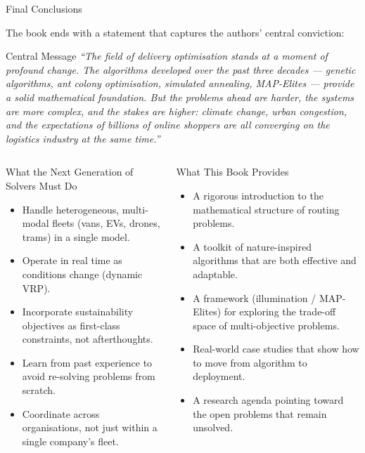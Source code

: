 \documentclass[aspectratio=169,10pt]{beamer}
\begin{document}
\begin{frame}[allowframebreaks]{Final Conclusions}

  The book ends with a statement that captures the authors'
  central conviction:

  \bigskip
  \begin{block}{Central Message}
    \textit{``The field of delivery optimisation stands at a moment
    of profound change.  The algorithms developed over the past three
    decades --- genetic algorithms, ant colony optimisation, simulated
    annealing, MAP-Elites --- provide a solid mathematical foundation.
    But the problems ahead are harder, the systems are more complex,
    and the stakes are higher: climate change, urban congestion, and
    the expectations of billions of online shoppers are all converging
    on the logistics industry at the same time.''}
  \end{block}

  \bigskip
  \begin{columns}[t]
    \begin{block}{What the Next Generation of Solvers Must Do}
      \begin{itemize}
        \item Handle heterogeneous, multi-modal fleets
              (vans, EVs, drones, trams) in a single model.
        \item Operate in real time as conditions change
              (dynamic VRP).
        \item Incorporate sustainability objectives
              as first-class constraints, not afterthoughts.
        \item Learn from past experience to avoid
              re-solving problems from scratch.
        \item Coordinate across organisations,
              not just within a single company's fleet.
      \end{itemize}
    \end{block}

    \begin{block}{What This Book Provides}
      \begin{itemize}
        \item A rigorous introduction to the mathematical
              structure of routing problems.
        \item A toolkit of nature-inspired algorithms
              that are both effective and adaptable.
        \item A framework (illumination / MAP-Elites)
              for exploring the trade-off space of
              multi-objective problems.
        \item Real-world case studies that show how
              to move from algorithm to deployment.
        \item A research agenda pointing toward the
              open problems that remain unsolved.
      \end{itemize}
    \end{block}
  \end{columns}


\end{frame}
\end{document}
